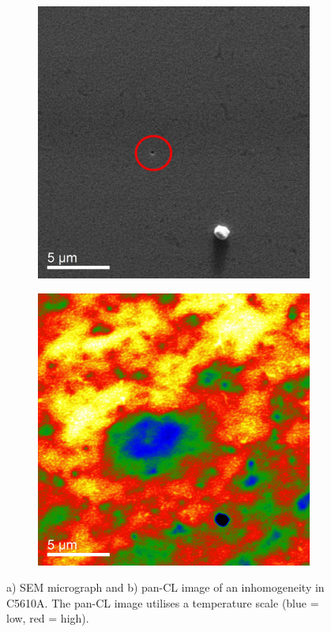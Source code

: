 \begin{figure}[h]
	
	\begin{subfigure}[b]{0.48\textwidth}
		\centering
		\includegraphics[width=0.7\linewidth]{Figs/Ch3/5610sem}
		\caption{}
		
	\end{subfigure}%
	\hspace*{0.5cm}
	\begin{subfigure}[b]{0.48\textwidth}
		\centering
		\includegraphics[width=0.7\linewidth]{Figs/Ch3/5610panCL}
		\caption{}
	\end{subfigure}%
	
	\caption{a) SEM micrograph and b) pan-CL image of an inhomogeneity in C5610A. The pan-CL image utilises a temperature scale (blue = low, red = high).}
	\label{5610-SEM-CL}
\end{figure}
\FloatBarrier

